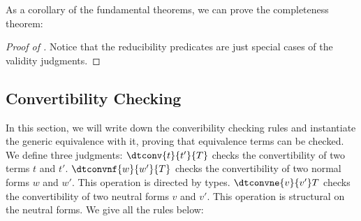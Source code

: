 As a corollary of the fundamental theorems, we can prove the completeness theorem:
\begin{proof}[Proof of ]
  Notice that the reducibility predicates are just special cases of the validity
  judgments. 
\end{proof}

\subsection{Convertibility Checking}

In this section, we will write down the converibility checking rules and instantiate
the generic equivalence with it, proving that equivalence terms can be checked. %
We define three judgments: $\dtconv{t}{t'}{T}$ checks the convertibility of two terms
$t$ and $t'$. %
$\dtconvnf{w}{w'}{T}$ checks the convertibility of two normal forms $w$ and $w'$. %
This operation is directed by types. %
$\dtconvne{v}{v'}T$ checks the convertibility of two neutral forms $v$ and $v'$. %
This operation is structural on the neutral forms. %
We give all the rules below:
